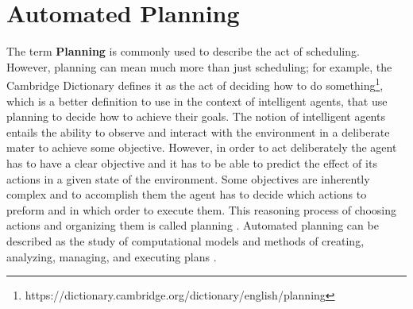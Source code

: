 \section{Automated Planning}

The term \textbf{Planning} is commonly used to describe the act of 
scheduling. However, planning can mean much more than just
scheduling; for example, the Cambridge Dictionary defines 
it as the act of deciding how to do something\footnote{https://dictionary.cambridge.org/dictionary/english/planning}, 
which is a better definition to use in the context of intelligent agents, that 
use planning to decide how to achieve their goals. The notion of intelligent agents entails the ability to observe and interact 
with the environment in a deliberate mater to achieve some objective. 
However, in order to act deliberately the agent has to have a clear objective 
and it has to be able to predict the effect of its actions in a given state of 
the environment.  Some objectives are inherently complex and to accomplish them 
the agent has to decide which actions to preform and in which order to execute 
them. This reasoning process of choosing actions and organizing them 
is called planning \cite{AutomatedPlanningTheoryghallab2006}. 
Automated planning can be described as the study of computational models and methods 
of creating, analyzing, managing, and 
executing plans \cite{IntroductionPlanningDomainhaslum2019}.



